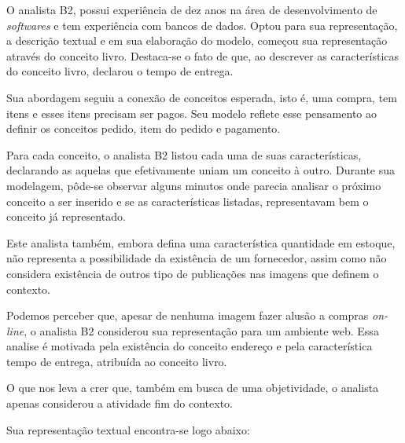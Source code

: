 O analista B2, possui experiência de dez anos na área de desenvolvimento de \textit{softwares} e tem experiência com bancos de dados. Optou para sua representação, a descrição textual e em sua elaboração do modelo, começou sua representação através do conceito livro. Destaca-se o fato de que, ao descrever as características do conceito livro, declarou o tempo de entrega.

Sua abordagem seguiu a conexão de conceitos esperada, isto é, uma compra, tem itens e esses itens precisam ser pagos. Seu modelo reflete esse pensamento ao definir os conceitos pedido, item do pedido e pagamento. 

Para cada conceito, o analista B2 listou cada uma de suas características, declarando as aquelas que efetivamente uniam um conceito à outro. Durante sua modelagem, pôde-se observar alguns minutos onde parecia analisar o próximo conceito a ser inserido e se as características listadas, representavam bem o conceito já representado.

Este analista também, embora defina uma característica quantidade em estoque, não representa a possibilidade da existência de um fornecedor, assim como não considera existência de outros tipo de publicações nas imagens que definem o contexto. 

Podemos perceber que, apesar de nenhuma imagem fazer alusão a compras \textit{on-line}, o analista B2 considerou sua representação para um ambiente web. Essa analise é motivada pela existência do conceito endereço e pela característica tempo de entrega, atribuída ao conceito livro.

O que nos leva a crer que, também em busca de uma objetividade, o analista apenas considerou a atividade fim do contexto. 

Sua representação textual encontra-se logo abaixo:

